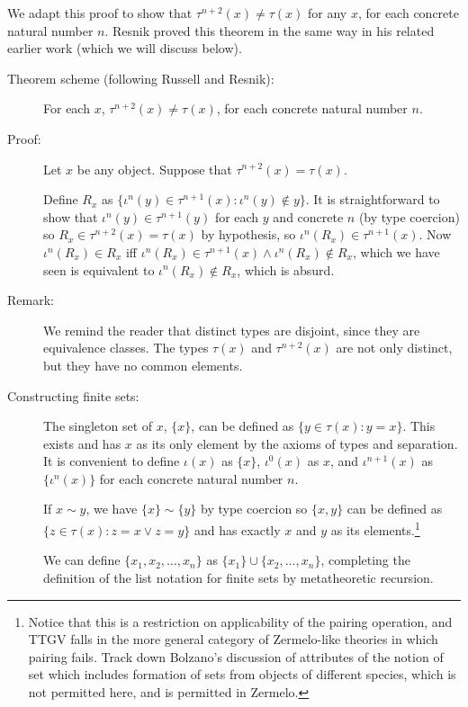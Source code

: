 \documentclass[12pt]{article}
\begin{document}
We adapt this proof to show that $\tau^{n+2}(x) \neq \tau(x)$ for any $x$, for each concrete natural number $n$.  Resnik proved this theorem in the same way in his related earlier work (which we will discuss below).
\begin{description}
\item[Theorem scheme (following Russell and Resnik):]  For each $x$, $\tau^{n+2}(x) \neq \tau(x)$, for each concrete natural number $n$.

\item[Proof:]  Let $x$ be any object.  Suppose that $\tau^{n+2}(x)=\tau(x)$. 

Define $R_x$ as $\{\iota^n(y)\in \tau^{n+1}(x):\iota^n(y) \not\in y\}$.  It is straightforward to show that $\iota^n(y) \in \tau^{n+1}(y)$ for each $y$ and concrete $n$ (by type coercion) so $R_x \in \tau^{n+2}(x) = \tau(x)$ by hypothesis, so $\iota^n(R_x) \in \tau^{n+1}(x)$.    Now $\iota^n(R_x) \in R_x$ iff $\iota^n(R_x) \in \tau^{n+1}(x) \wedge \iota^n(R_x) \not\in R_x$, which we have seen is equivalent to $\iota^n(R_x) \not\in R_x$, which is absurd.

\item[Remark:]  We remind the reader that distinct types are disjoint, since they are equivalence classes.  The types $\tau(x)$ and $\tau^{n+2}(x)$ are not only distinct, but they have no common  elements.

\item[Constructing finite sets:]  The singleton set of $x$, $\{x\}$, can be defined as $\{y \in \tau(x):y=x\}$.  This exists and has $x$ as its only element by the axioms of types and separation.  It is convenient to define $\iota(x)$ as $\{x\}$, $\iota^0(x)$ as $x$,
and $\iota^{n+1}(x)$ as $\{\iota^n(x)\}$ for each concrete natural number $n$.

If $x \sim y$, we have $\{x\} \sim \{y\}$ by type coercion so $\{x,y\}$ can be defined
as $\{z \in \tau(x):z =x \vee z=y\}$ and has exactly $x$ and $y$ as its elements.\footnote{Notice that this is a restriction on applicability of the pairing operation, and TTGV falls in the more general category of Zermelo-like theories in which pairing fails. Track down Bolzano's discussion of attributes of the notion of set which includes formation of sets from objects of different species, which is not permitted here, and is permitted in Zermelo.}

We can define $\{x_1,x_2,\ldots,x_n\}$ as $\{x_1\} \cup \{x_2,\ldots,x_n\}$, completing the definition of the list notation for finite sets by metatheoretic recursion.


\end{description}
\end{document}
